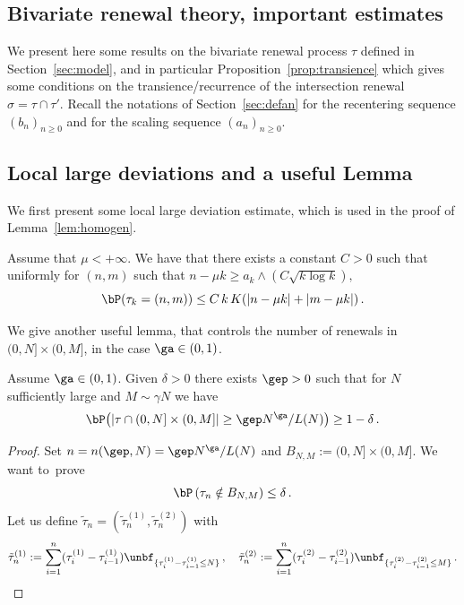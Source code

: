 \begin{appendix}
\section{Bivariate renewal theory, important estimates}\label{app:bivrenewal}

We present here some results on the bivariate renewal process $\tau$ defined in Section~\ref{sec:model}, and in particular Proposition~\ref{prop:transience} which gives some conditions on the transience/recurrence of the intersection renewal $\sigma=\tau\cap\tau'$. Recall the notations of Section~\ref{sec:defan} for the recentering sequence $(b_n)_{n\geq 0}$ and for the scaling sequence $(a_n)_{n\geq 0}$.


\subsection{Local large deviations and a useful Lemma}

We first present some local large deviation estimate, which is used in the proof of Lemma~\ref{lem:homogen}.

\begin{theo}[{\cite[Theorem~2.4]{cf:B}}]\label{thm:locallargedev}
Assume that $\mu<+\infty$. We have that there exists a constant $C>0$ such that uniformly for $(n,m)$ such that $n - \mu k \geq a_k \wedge (C\sqrt{k\log k}),$
\[
\bP(\tau_k =(n,m)) \leq C\,k\,K(|n-\mu k| + |m-\mu k|)\,.
\]
\end{theo}

We give another useful lemma, that controls the number of renewals in $(0,N]\times(0,M]$, in the case $\ga\in(0,1)$.

\begin{lemm}\label{th:limp}
Assume $\ga\in(0,1)$. Given $\delta>0$ there exists $\gep>0$ such that for $N$ sufficiently large and $M \sim \gamma N$ we have
\begin{equation}
\bP \big(\vert \tau \cap (0,N] \times (0,M] \vert \ge \gep N^{\ga}/L(N) \big) \ge 1- \delta\,.
\end{equation}
\end{lemm}

\begin{proof}
Set $n = n(\gep,N) = \gep N^{\ga}/L(N)$ and $B_{N,M} := (0,N]\times (0,M]$. We want to~prove
\begin{equation}
\bP \left(\tau_n \notin B_{N,M} \right) \le \delta\,.
\end{equation}
Let us define $\tilde \tau_n = (\tilde \tau_n^{(1)},\tilde \tau_n^{(2)})$ with
\begin{equation}
\tilde{\tau}^{(1)}_n := \sum_{i=1}^n (\tau_i^{(1)} - \tau_{i-1}^{(1)}) \unbf_{ \lbrace \tau_i^{(1)} - \tau_{i-1}^{(1)} \le N \rbrace}\,,\quad
\tilde{\tau}^{(2)}_n := \sum_{i=1}^n (\tau_i^{(2)} - \tau_{i-1}^{(2)}) \unbf_{ \lbrace \tau_i^{(2)} - \tau_{i-1}^{(2)} \le M \rbrace}\,.
\end{equation}


\end{proof}
\end{appendix}
